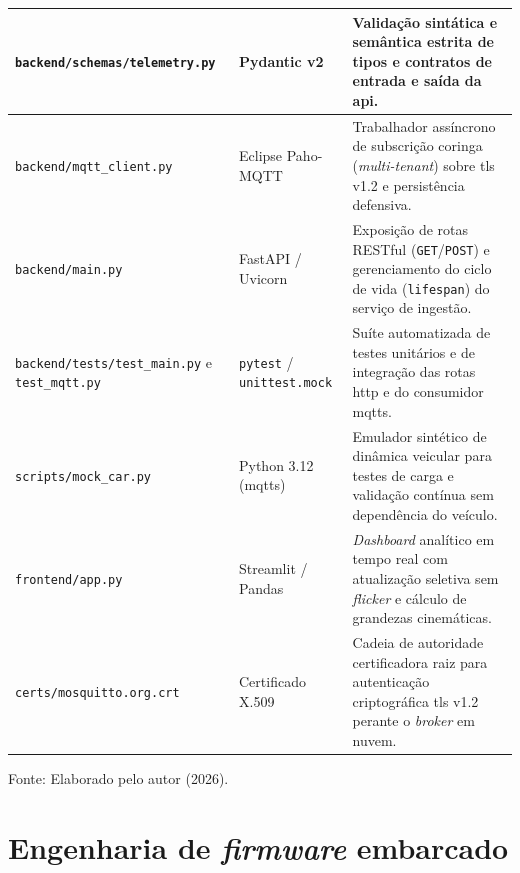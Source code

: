 \documentclass[
	12pt,				%
	openright,			%
	twoside,			%
	a4paper,			%
	english,			%
	brazil				%
	]{abntex2}
\begin{document}
\begin{table}[!htb]
{\begin{tabular}{|>{\raggedright\arraybackslash}p{4.3cm}|>{\raggedright\arraybackslash}p{2.7cm}|>{\raggedright\arraybackslash}p{6.8cm}|}
\texttt{backend/\allowbreak schemas/\allowbreak telemetry.py} & Pydantic v2
    & Validação sintática e semântica estrita de tipos e contratos de entrada e saída da
    \acrshort{api}. \\ \hline
\texttt{backend/\allowbreak mqtt\_client.py} & Eclipse Paho-MQTT
    & Trabalhador assíncrono de subscrição coringa (\textit{multi-tenant}) sobre
    \acrshort{tls} v1.2 e persistência defensiva. \\ \hline
\texttt{backend/\allowbreak main.py} & FastAPI / Uvicorn
    & Exposição de rotas RESTful (\texttt{GET}/\texttt{POST}) e gerenciamento do ciclo
    de vida (\texttt{lifespan}) do serviço de ingestão. \\ \hline
\texttt{backend/\allowbreak tests/\allowbreak test\_main.py} e \texttt{test\_mqtt.py}
    & \texttt{pytest} / \texttt{unittest.mock}
    & Suíte automatizada de testes unitários e de integração das rotas \acrshort{http} e
    do consumidor \acrshort{mqtts}. \\ \hline
\texttt{scripts/\allowbreak mock\_car.py} & Python 3.12 (\acrshort{mqtts})
    & Emulador sintético de dinâmica veicular para testes de carga e validação contínua
    sem dependência do veículo. \\ \hline
\texttt{frontend/\allowbreak app.py} & Streamlit / Pandas
    & \textit{Dashboard} analítico em tempo real com atualização seletiva sem
    \textit{flicker} e cálculo de grandezas cinemáticas. \\ \hline
\texttt{certs/\allowbreak mosquitto.org.crt} & Certificado X.509
    & Cadeia de autoridade certificadora raiz para autenticação criptográfica
    \acrshort{tls} v1.2 perante o \textit{broker} em nuvem. \\ \hline
\end{tabular}\par}
\vspace{4pt}
{\footnotesize\raggedright
Fonte: Elaborado pelo autor (2026).\par}
\end{table}

\section{Engenharia de \textit{firmware} embarcado}
\end{document}
